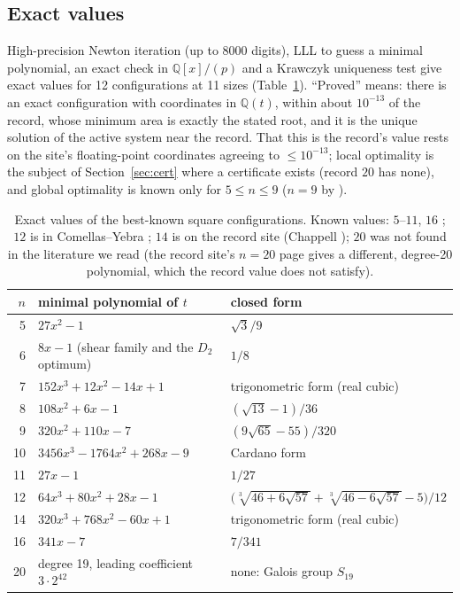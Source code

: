 \documentclass[11pt]{amsart}
\theoremstyle{definition}
\newcommand{\Q}{\mathbb{Q}}
\begin{document}
\subsection{Exact values}
High-precision Newton iteration (up to 8000 digits), LLL to guess a minimal polynomial, an exact check in $\Q[x]/(p)$ and a Krawczyk uniqueness test give exact values for 12 configurations at 11 sizes (Table~\ref{tab:exact}). %
``Proved'' means: there is an exact configuration with coordinates in $\Q(t)$, within about $10^{-13}$ of the record, whose minimum area is exactly the stated root, and it is the unique solution of the active system near the record. That this is the record's value rests on the site's floating-point coordinates agreeing to $\le 10^{-13}$; local optimality is the subject of Section~\ref{sec:cert} where a certificate exists (record $20$ has none), and global optimality is known only for $5 \le n \le 9$ ($n = 9$ by \cite{N9}). %

\begin{table}[htbp]
\centering\small
\renewcommand{\arraystretch}{1.2}
\caption{Exact values of the best-known square configurations. Known values: $5$--$11$, $16$ \cite{SM,CY}; $12$ is in Comellas--Yebra \cite{CY}; $14$ is on the record site (Chappell \cite{Chappell}); $20$ was not found in the literature we read (the record site's $n = 20$ page gives a different, degree-20 polynomial, which the record value does not satisfy).}\label{tab:exact}
\begin{tabular}{@{}rll@{}}
\toprule
$n$ & minimal polynomial of $t$ & closed form \\
\midrule
5 & $27x^2-1$ & $\sqrt3/9$ \\
6 & $8x-1$ (shear family and the $D_2$ optimum) & $1/8$ \\
7 & $152x^3+12x^2-14x+1$ & trigonometric form (real cubic) \\
8 & $108x^2+6x-1$ & $(\sqrt{13}-1)/36$ \\
9 & $320x^2+110x-7$ & $(9\sqrt{65}-55)/320$ \\
10 & $3456x^3-1764x^2+268x-9$ & Cardano form \\
11 & $27x-1$ & $1/27$ \\
12 & $64x^3+80x^2+28x-1$ & $\bigl(\sqrt[3]{46+6\sqrt{57}}+\sqrt[3]{46-6\sqrt{57}}-5\bigr)/12$ \\
14 & $320x^3+768x^2-60x+1$ & trigonometric form (real cubic) \\
16 & $341x-7$ & $7/341$ \\
20 & degree 19, leading coefficient $3\cdot2^{42}$ & none: Galois group $S_{19}$ \\
\bottomrule
\end{tabular}
\end{table}
\end{document}
